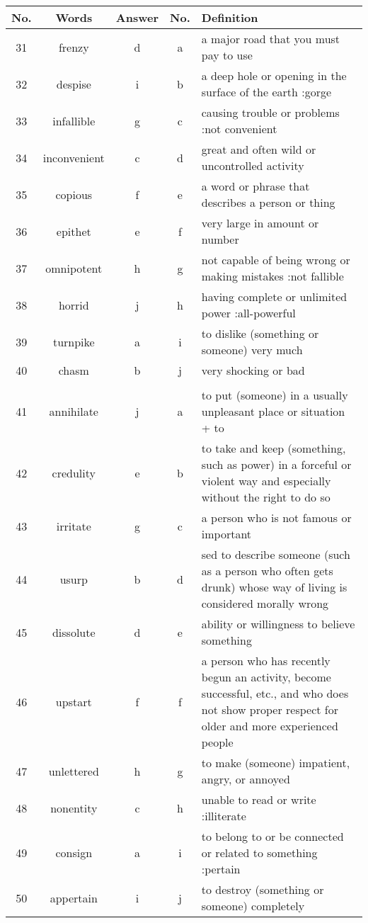 \documentclass[a4paper]{article}
\begin{document}
\begin{center}
\begin{tabular}{|c|c|c|c|m{}|}
\hline
No. & Words & Answer & No. & Definition \\
\hline
 31  & frenzy & d & a &  a major road that you must pay to use \\
\hline
 32  & despise & i & b &  a deep hole or opening in the surface of the earth :gorge\\
\hline
 33  & infallible & g & c &  causing trouble or problems :not convenient \\
\hline
 34  & inconvenient & c & d &  great and often wild or uncontrolled activity \\
\hline
 35  & copious & f & e &  a word or phrase that describes a person or thing \\
\hline
 36  & epithet & e & f &  very large in amount or number \\
\hline
 37  & omnipotent & h & g &  not capable of being wrong or making mistakes :not fallible \\
\hline
 38  & horrid & j & h &  having complete or unlimited power :all-powerful \\
\hline
 39  & turnpike & a & i &  to dislike (something or someone) very much \\
\hline
 40  & chasm & b & j &  very shocking or bad \\
\hline
 & & & & \\
\hline
 41  & annihilate & j & a &  to put (someone) in a usually unpleasant place or situation + to \\
\hline
 42  & credulity & e & b &  to take and keep (something, such as power) in a forceful or violent way and especially without the right to do so \\
\hline
 43  & irritate & g & c &  a person who is not famous or important \\
\hline
 44  & usurp & b & d &  sed to describe someone (such as a person who often gets drunk) whose way of living is considered morally wrong \\
\hline
 45  & dissolute & d & e &  ability or willingness to believe something \\
\hline
 46  & upstart & f & f &  a person who has recently begun an activity, become successful, etc., and who does not show proper respect for older and more experienced people \\
\hline
 47  & unlettered & h & g &  to make (someone) impatient, angry, or annoyed \\
\hline
 48  & nonentity & c & h &  unable to read or write :illiterate \\
\hline
 49  & consign & a & i &  to belong to or be connected or related to something :pertain \\
\hline
 50  & appertain & i & j &  to destroy (something or someone) completely \\
\end{tabular}
\end{center}
\end{document}
